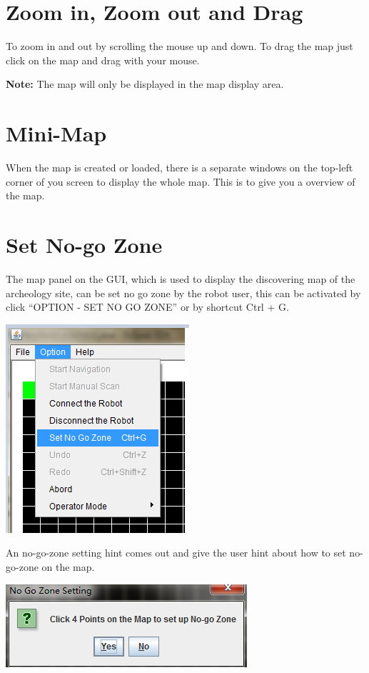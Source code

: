 \documentclass[11pt, a4paper]{report}
\begin{document}
\section{Zoom in, Zoom out and Drag}
To zoom in and out by scrolling the mouse up and down. To drag the map just click on the map and drag with your mouse.

\noindent\textbf{Note: } The map will only be displayed in the map display area.\\

\section{Mini-Map}
When the map is created or loaded, there is a separate windows on the top-left corner of you screen to display the whole map. This is to give you a overview of the map.


\section{Set No-go Zone}
The map panel on the GUI, which is used to display the discovering map of the archeology site, can be set no go zone by the robot user, this can be activated by click  ``OPTION - SET NO GO ZONE'' or by shortcut Ctrl + G. 

\begin{center}
\includegraphics[scale=1]{./image/NoGoZone.png}\\[1cm]
\end{center}

An no-go-zone setting hint comes out and give the user hint about how to set no-go-zone on the map.

\begin{center}
\includegraphics[scale=1]{./image/NoGoZonePop.png}\\[1cm]
\end{center}
\end{document}
